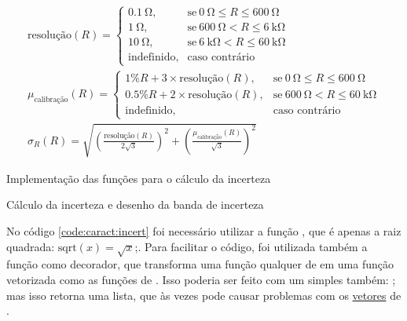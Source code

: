     \begin{eqnarray}
        \label{eq:resolucao}
        \text{resolução}(R) = \begin{cases}
            \SI{0.1}{\ohm}, & \text{se}~ \SI{0}{\ohm} \le R \le \SI{600}{\ohm} \\
            \SI{1}{\ohm},   & \text{se}~ \SI{600}{\ohm} < R \le \SI{6}{\kilo\ohm} \\
            \SI{10}{\ohm},  & \text{se}~ \SI{6}{\kilo\ohm} < R \le \SI{60}{\kilo\ohm} \\
            \text{indefinido}, & \text{caso contrário}
        \end{cases} \\%
        \label{eq:calibracao}
        \mu_\text{calibração}(R) = \begin{cases}
            1\% R + 3 \times \text{resolução}(R),   & \text{se}~ \SI{0}{\ohm} \le R \le \SI{600}{\ohm} \\
            0.5\% R + 2 \times \text{resolução}(R), & \text{se}~ \SI{600}{\ohm} < R \le \SI{60}{\kilo\ohm} \\
            \text{indefinido}, & \text{caso contrário}
        \end{cases} \\%
        \label{eq:incerteza}
        \sigma_R(R) = \sqrt{\left(\frac{\text{resolução}(R)}{2 \sqrt{3}} \right)^2 + \left(\frac{\mu_\text{calibração}(R)}{\sqrt{3}} \right)^2}
    \end{eqnarray}

    \begin{listing}[H]
        \caption{Implementação das funções para o cálculo da incerteza}
        \label{code:caract:incert}

    \end{listing}

    \begin{listing}[H]
        \caption{Cálculo da incerteza e desenho da banda de incerteza}
        \label{code:caract:bandas}

    \end{listing}

    No código \ref{code:caract:incert} foi necessário utilizar a função , que é apenas a raiz quadrada: $\text{sqrt}(x) = \sqrt{x}$;. Para facilitar o código, foi utilizada também a função  como decorador, que transforma uma função qualquer de \python em uma função vetorizada como as funções de \numpy. Isso poderia ser feito com um simples  também: ; mas isso retorna uma lista, que às vezes pode causar problemas com os \href{https://docs.scipy.org/doc/numpy/reference/arrays.html}{vetores} de \numpy.

